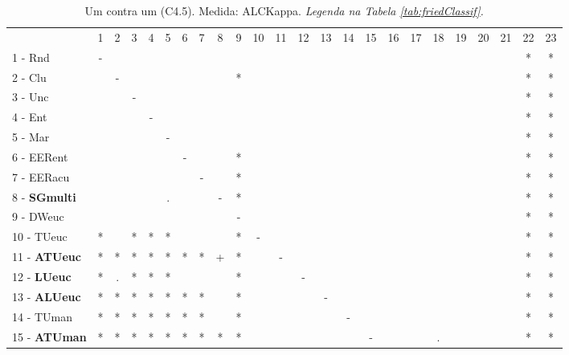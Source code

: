 \begin{table}[h]
\caption{Um contra um (C4.5). Medida: ALCKappa. \textit{Legenda na Tabela \ref{tab:friedClassif}.}}
\begin{center}\begin{tabular}{lcc|cc|cc|cc|cc|cc|cc|cc|cc|cc|cc|c}
 			& 1 & 2 & 3 & 4 & 5 & 6 & 7 & 8 & 9 & 10 & 11 & 12 & 13 & 14 & 15 & 16 & 17 & 18 & 19 & 20 & 21 & 22 & 23\\
1 - Rnd  	& - &   &   &   &   &   &   &   &   &   &   &   &   &   &   &   &   &   &   &   &   & * & * \\
2 - Clu  	&   & - &   &   &   &   &   &   & * &   &   &   &   &   &   &   &   &   &   &   &   & * & * \\ \hline
3 - Unc  	&   &   & - &   &   &   &   &   &   &   &   &   &   &   &   &   &   &   &   &   &   & * & * \\
4 - Ent  	&   &   &   & - &   &   &   &   &   &   &   &   &   &   &   &   &   &   &   &   &   & * & * \\ \hline
5 - Mar  	&   &   &   &   & - &   &   &   &   &   &   &   &   &   &   &   &   &   &   &   &   & * & * \\
6 - EERent	&   &   &   &   &   & - &   &   & * &   &   &   &   &   &   &   &   &   &   &   &   & * & * \\ \hline
7 - EERacu	&   &   &   &   &   &   & - &   & * &   &   &   &   &   &   &   &   &   &   &   &   & * & * \\
8 - \textbf{SGmulti}	&   &   &   &   & . &   &   & - & * &   &   &   &   &   &   &   &   &   &   &   &   & * & * \\ \hline
9 - DWeuc	&   &   &   &   &   &   &   &   & - &   &   &   &   &   &   &   &   &   &   &   &   & * & * \\
10 - TUeuc	& * &   & * & * & * &   &   &   & * & - &   &   &   &   &   &   &   &   &   &   &   & * & * \\ \hline
11 - \textbf{ATUeuc}	& * & * & * & * & * & * & * & + & * &   & - &   &   &   &   &   &   &   &   &   &   & * & * \\
12 - \textbf{LUeuc}	& * & . & * & * & * &   &   &   & * &   &   & - &   &   &   &   &   &   &   &   &   & * & * \\ \hline
13 - \textbf{ALUeuc}	& * & * & * & * & * & * & * &   & * &   &   &   & - &   &   &   &   &   &   &   &   & * & * \\
14 - TUman	& * & * & * & * & * & * & * &   & * &   &   &   &   & - &   &   &   &   &   &   &   & * & * \\ \hline
15 - \textbf{ATUman}	& * & * & * & * & * & * & * & * & * &   &   &   &   &   & - &   &   & . &   &   &   & * & * \\

\end{tabular}
\end{center}
\end{table}
